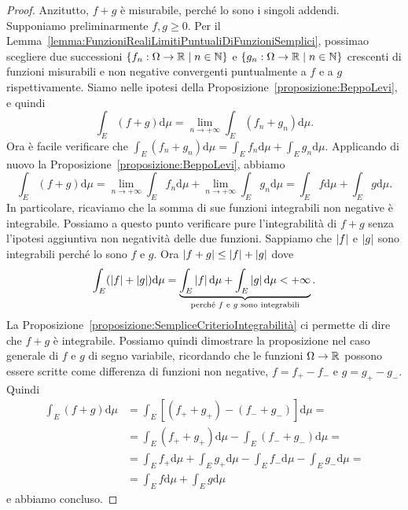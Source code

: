 \begin{proof}
Anzitutto, \(f+g\) è misurabile, perché lo sono i singoli addendi. Supponiamo preliminarmente \(f, g \ge 0\). Per il Lemma~\ref{lemma:FunzioniRealiLimitiPuntualiDiFunzioniSemplici}, possimao scegliere due successioni \(\left\{f_n : \Omega \to \mathbb R \mid n \in \mathbb N\right\}\) e \(\left\{g_n : \Omega \to \mathbb R \mid n \in \mathbb N\right\}\) crescenti di funzioni misurabili e non negative convergenti puntualmente a \(f\) e a \(g\) rispettivamente. Siamo nelle ipotesi della Proposizione~\ref{proposizione:BeppoLevi}, e quindi
\[\int_E (f+g) \mathrm d \mu = \lim_{n \to +\infty} \int_E (f_n + g_n) \mathrm d \mu .\]
Ora è facile verificare che \(\int_E (f_n + g_n) \mathrm d \mu = \int_E f_n \mathrm d \mu + \int_E g_n \mathrm d \mu\). Applicando di nuovo la Proposizione~\ref{proposizione:BeppoLevi}, abbiamo
\[\int_E (f+g) \mathrm d \mu = \lim_{n \to +\infty} \int_E f_n \mathrm d \mu + \lim_{n \to +\infty} \int_E g_n \mathrm d \mu = \int_E f \mathrm d \mu + \int_E g \mathrm d \mu .\]
In particolare, ricaviamo che la somma di sue funzioni integrabili non negative è integrabile. Possiamo a questo punto verificare pure l'integrabilità di \(f+g\) senza l'ipotesi aggiuntiva non negatività delle due funzioni. Sappiamo che \(\left\lvert f\right\rvert\) e \(\left\lvert g\right\rvert\) sono integrabili perché lo sono \(f\) e \(g\). Ora \(\left\lvert f+g\right\rvert \le \left\lvert f\right\rvert + \left\lvert g\right\rvert\) dove
\[\int_E (\left\lvert f\right\rvert + \left\lvert g\right\rvert) \mathrm d \mu = \underbrace{\int_E \left\lvert f\right\rvert \mathrm d \mu + \int_E \left\lvert g\right\rvert \mathrm d \mu < +\infty}_{\text{perché \(f\) e \(g\) sono integrabili}} .\]
La Proposizione~\ref{proposizione:SempliceCriterioIntegrabilità} ci permette di dire che \(f+g\) è integrabile.
Possiamo quindi dimostrare la proposizione nel caso generale di \(f\) e \(g\) di segno variabile, ricordando che le funzioni \(\Omega \to \mathbb R\) possono essere scritte come differenza di funzioni non negative, \(f = f_+ - f_-\) e \(g = g_+ - g_-\). Quindi
\begin{align*}
\int_E (f+g) \mathrm d \mu &= \int_E [(f_+ + g_+) - (f_-+g_-)] \mathrm d \mu = \\
&= \int_E (f_+ + g_+) \mathrm d \mu  - \int_E (f_-+g_-) \mathrm d \mu = \\
&= \int_E f_+ \mathrm d \mu + \int_E g_+ \mathrm d \mu  - \int_E f_- \mathrm d \mu - \int_E g_- \mathrm d \mu = \\
&= \int_E f \mathrm d \mu + \int_E g \mathrm d \mu 
\end{align*}
e abbiamo concluso.
\end{proof}

